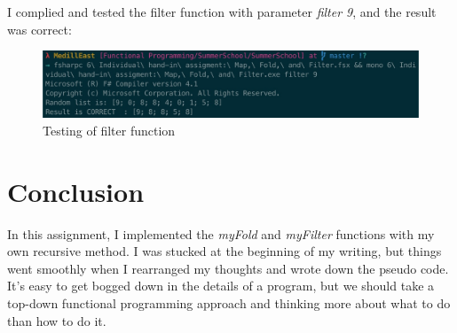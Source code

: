 I complied and tested the filter function with parameter \emph{filter 9}, and the result was correct:

\begin{figure}[h]
      \centering
      \includegraphics[width=\linewidth]{filter}
      \caption{Testing of filter function}
      \label{fig:filter}
\end{figure}

\section{Conclusion}

In this assignment, I implemented the \emph{myFold} and \emph{myFilter} functions with my own recursive method. I was stucked at the beginning of my writing, but things went smoothly when I rearranged my thoughts and wrote down the pseudo code. It's easy to get bogged down in the details of a program, but we should take a top-down functional programming approach and thinking more about what to do than how to do it.